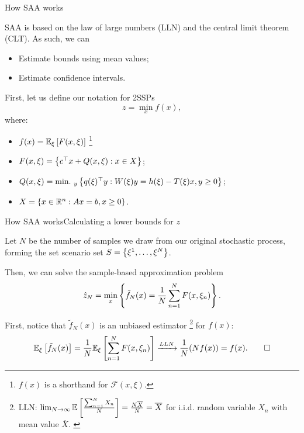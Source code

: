 \begin{frame}{How SAA works}

	SAA is based on the \alert{law of large numbers} (LLN) and the \alert{central limit theorem} (CLT). As such, we can
	\vspace{-6pt} 
	\begin{itemize}
		\item Estimate bounds using mean values;
		\item Estimate confidence intervals.
	\end{itemize}
	
	\pause 
	First, let us define our notation for \alert{2SSP}s
	\begin{equation*}
		z = \min_x f(x), 	
	\end{equation*}
	where: 
	\begin{itemize}
		\item $f(x) = \mathbb{E}_\xi\left[ F(x, \xi) \right]$%
		\footnote{$f(x)$ is a shorthand for $\mathcal{F}(x,\xi)$.}
		\item $F(x,\xi) = \left\{ c^\top x + Q(x,\xi) : x \in X \right \}$;
		\item $Q(x, \xi) = \mathop{\text{min.} \ }_y \left\{ q(\xi)^\top y : W(\xi)y = h(\xi) - T(\xi)x, y \ge 0 \right \}$;
		\item $X=\left\{ x \in \mathbb R^n : Ax = b, x \ge 0 \right \}$.	
	\end{itemize}
	
\end{frame}


\begin{frame}{How SAA works}{Calculating a lower bounds for $z$}

	Let $N$ be the number of samples we draw from our original stochastic process, forming the set scenario set $S = \left\{ \xi^1, \dots, \xi^N \right \}$.
	
	Then, we can solve the sample-based approximation problem
	\begin{equation}
		\hat{z}_N = \min_x \left\{ \tilde{f}_N(x) = \frac{1}{N}\sum_{n=1}^N F(x,\xi_n) \right \}.
	\end{equation}
	
	\pause
	First, notice that $\tilde{f}_N(x)$ is an \alert{unbiased estimator}%
	\footnote{LLN: $\lim_{N \rightarrow \infty} \mathbb{E}\left[ \frac{\sum_{n=1}^N X_n}{N} \right] = \frac{N \overline{X}}{N} = \overline{X}$ for i.i.d. random variable $X_n$ with mean value $\overline{X}$. \label{fn:unbiased_estimator}} 
	for $f(x)$:
	\begin{equation*}
		\mathbb{E}_\xi\left[ \tilde{f}_N(x) \right] = \frac{1}{N}\mathbb{E}_\xi\left[ \sum_{n=1}^N F(x,\xi_n) \right] \xrightarrow{LLN} \frac{1}{N} (Nf(x)) = f(x).	\qed
	\end{equation*}

\end{frame}



